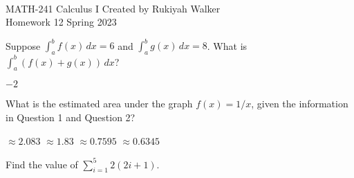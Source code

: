 \documentclass[addpoints, 12pt]{exam}%
\newcommand{\spc}{\vspace*{0.5cm}}
\begin{document}
\noindent \hrulefill \\
	MATH-241 Calculus I \hfill Created by Rukiyah Walker\\
	Homework 12 \hfill Spring 2023\\ \vspace*{-1cm}
 
	\noindent\hrulefill


\begin{questions}

\vspace*{0.5cm}

\question[1]

Suppose $\int_{a}^{b} f(x) \,dx = 6$ and $\int_{a}^{b} g(x) \,dx = 8$. What is $\int_{a}^{b} (f(x) + g(x)) \,dx$?

\begin{multicols}{2}
\begin{choices}
\choice $-2$
\end{choices}
\end{multicols}

\spc

\question[1]

What is the estimated area under the graph $f(x) = 1/x$, given the information in Question 1 and Question 2?

\begin{multicols}{2}
\begin{choices}
\choice $\approx 2.083$
\choice $\approx 1.83$
\choice $\approx 0.7595$
\CorrectChoice $\approx 0.6345$ 
\end{choices}
\end{multicols}

\spc

\question[1]

Find the value of $\sum_{i=1}^{5} 2(2i+1)$.

\begin{multicols}{2}
\begin{choices}
\end{choices}
\end{multicols}


\end{questions}
\end{document}
